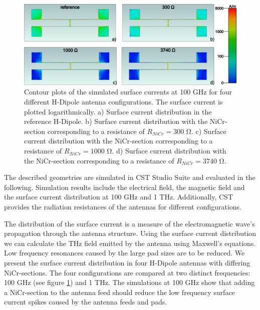 \begin{figure}[ht]
    \centering
    \includegraphics[width=\linewidth]{figures/Contour_Plots_v2/100Ghz_SC_sim_plots.png}
    \caption{Contour plots of the simulated surface currents at \num{100} \si{\giga \hertz} for four different H-Dipole antenna configurations. The surface current is plotted logarithmically. a) Surface current distribution in the reference H-Dipole. b) Surface current distribution with the NiCr-section corresponding to a resistance of $R_{NiCr} = 300$ \si{\ohm}. c) Surface current distribution with the NiCr-section corresponding to a resistance of $R_{NiCr} = 1000$ \si{\ohm}. d) Surface current distribution with the NiCr-section corresponding to a resistance of $R_{NiCr} = 3740$ \si{\ohm}.}
    \label{sc_100ghz_comp}
\end{figure}

The described geometries are simulated in CST Studio Suite and evaluated in the following. Simulation results include the electrical field, the magnetic field and the surface current distribution at \num{100} \si{\giga \hertz} and \num{1} \si{\tera \hertz}. Additionally, CST provides the radiation resistances of the antennas for different configurations. 

The distribution of the surface current is a measure of the electromagnetic wave's propagation through the antenna structure. Using the surface current distribution we can calculate the THz field emitted by the antenna using Maxwell's equations. Low frequency resonances caused by the large pad sizes are to be reduced. We present the surface current distribution in four H-Dipole antennas with differing NiCr-sections. The four configurations are compared at two distinct frequencies: \num{100} \si{\giga \hertz} (see figure \ref{sc_100ghz_comp}) and \num{1} \si{\tera \hertz}. The simulations at \num{100} \si{\giga \hertz} show that adding a NiCr-section to the antenna feed should reduce the low frequency surface current spikes caused by the antenna feeds and pads.

